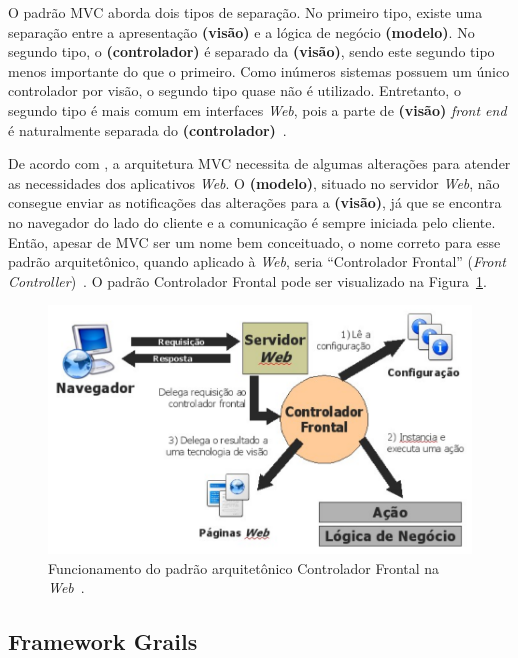 O padrão MVC aborda dois tipos de separação. No primeiro tipo, existe uma separação entre a apresentação \textbf{(visão)} e a lógica de negócio \textbf{(modelo)}. No segundo tipo, o \textbf{(controlador)} é separado da \textbf{(visão)}, sendo este segundo tipo menos importante do que o primeiro. Como inúmeros sistemas possuem um único controlador por visão, o segundo tipo quase não é utilizado. Entretanto, o segundo tipo é mais comum em interfaces \textit{Web}, pois a parte de \textbf{(visão)} \textit{front end} é naturalmente separada do \textbf{(controlador)}~\cite{fowler:peaa02}.

De acordo com , a arquitetura MVC necessita de algumas alterações para atender as necessidades dos aplicativos \textit{Web}. O \textbf{(modelo)}, situado no servidor \textit{Web}, não consegue enviar as notificações das alterações para a \textbf{(visão)}, já que se encontra no navegador do lado do cliente e a comunicação é sempre iniciada pelo cliente. Então, apesar de MVC ser um nome bem conceituado, o nome correto para esse padrão arquitetônico, quando aplicado à \textit{Web}, seria ``Controlador Frontal'' (\textit{Front Controller})~\cite{alur-et-al:bpds03}. O padrão Controlador Frontal pode ser visualizado na Figura~\ref{fig-ref-controlador-frontal}.   

\begin{figure}[h]
	\centering
	\includegraphics[scale=.45]{figuras/fig-ref-controlador-frontal} 
	\caption{Funcionamento do padrão arquitetônico Controlador Frontal na \textit{Web}~\cite{souza:masterthesis07}.}
	\label{fig-ref-controlador-frontal}
\end{figure}

\subsection{Framework Grails}
\label{sec-ref-framework-grails}

